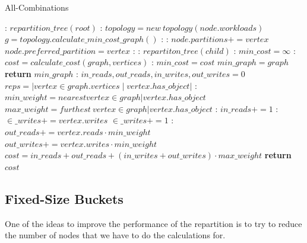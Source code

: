 \begin{algorithm}
  \caption{All-Combinations}\label{alg:all-combinations}
  \begin{algorithmic}[1]
  :
  \State $repartition\_tree(root)$
  \EndFunction
  :
      \State $topology = new\ topology(node.workloads)$
      \State $g = topology.calculate\_min\_cost\_graph()$
      :
        :
        \State $node.partitions += vertex$
            \State $node.preferred\_partition = vertex$
          \EndIf
        \EndIf
      \EndFor
    \EndIf
    :
      :
        \State $repartiton\_tree(child)$
        \EndFor
    \EndIf
    \EndFunction
    :
    \State $min\_cost = \infty$
      :
        \State $cost = calculate\_cost(graph, vertices)$
        :
          \State $min\_cost = cost$
          \State $min\_graph = graph$
        \EndIf
      \EndFor
    \State \textbf{return} $min\_graph$
    \EndFunction
    :
      \State $in\_reads, out\_reads, in\_writes, out\_writes = 0$
      \State $reps = |vertex \in graph.vertices \mid vertex.has\_object|$
      :
      \State $min\_weight = nearest vertex \in graph | vertex.has\_object$
      \State $max\_weight = furthest\ vertex \in graph | vertex.has\_object$
        :
          \State $in\_reads+= 1$
          :
          \State $\in\_writes+= vertex.writes$
          \Else
          \State  $\in\_writes+= 1 $
          \EndIf
        \Else:
          \State $out\_reads += vertex.reads \cdot min\_weight$
          \State $out\_writes += vertex.writes \cdot min\_weight$
        \EndIf
      \EndFor
      \State $cost = in\_reads+ out\_reads + (in\_writes+ out\_writes) \cdot max\_weight$
      \State \textbf{return} $cost$
  \EndFunction
  \end{algorithmic}
  \end{algorithm}

\subsection{Fixed-Size Buckets}\label{sec:Fixed-Size buckets}
One of the ideas to improve the performance of the repartition is to try to reduce the number of nodes that we have to do the calculations for.

